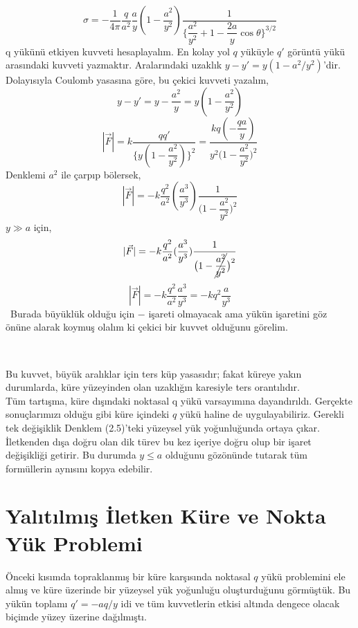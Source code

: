 \begin{theorem}
\[ \sigma = - \dfrac{1}{4 \pi}  \dfrac{q}{a^{2}}  \dfrac{a}{y}  ( 1 - \dfrac{a^{2}}{y^{2}}) \dfrac{1}{\Big\{ \dfrac{a^{2}}{y^{2}} + 1 - \dfrac{2a}{y} \cos \theta \Big\}^{3/2}} \tag{2.5} \]
q yükünü etkiyen kuvveti hesaplayalım. En kolay yol $q$ yüküyle $q'$ görüntü yükü arasındaki kuvveti yazmaktır. Aralarındaki uzaklık $y-y' = y (1- a^{2}/y^{2})$'dir. Dolayısıyla Coulomb yasasına göre, bu çekici kuvveti yazalım,
\[y-y' = y - \dfrac{a^{2}}{y} = y (1-\dfrac{a^{2}}{y^{2}}) \]
\[ |\Vec{F}| = k \dfrac{qq'}{\big\{ y (1- \dfrac{a^{2}}{y^{2}})  \big\}^{2}}  = \dfrac{kq (- \dfrac{qa}{y})}{y^{2} \big(1 - \dfrac{a^{2}}{y^{2}} \big)^{2}} \]
Denklemi $a^{2}$ ile çarpıp bölersek,
\[ |\Vec{F}| = - k \dfrac{q^{2}}{a^{2}} (\dfrac{a^{3}}{y^{3}}) \dfrac{1}{ \big(1 - \dfrac{a^{2}}{y^{2}}\big)^{2}} \tag{2.6}\]
$y \gg a$ için,
\[ |\Vec{F}| = - k \dfrac{q^{2}}{a^{2}} (\dfrac{a^{3}}{y^{3}}) \dfrac{1}{\big(1 - \cancel{\dfrac{a^{2}}{y^{2}}} \big)^{2}} \]
\[ |\Vec{F}| = -k \dfrac{q^{2}}{a^{2}} \dfrac{a^{3}}{y^{3}} = -k q^{2} \dfrac{a}{y^{3}} \]
\dangersign \ Burada büyüklük olduğu için $-$ işareti olmayacak ama yükün işaretini göz önüne alarak koymuş olalım ki çekici bir kuvvet olduğunu görelim.
\end{theorem}

\ 

Bu kuvvet, büyük aralıklar için ters küp yasasıdır; fakat küreye yakın durumlarda, küre yüzeyinden olan uzaklığın karesiyle ters orantılıdır.\\
Tüm tartışma, küre dışındaki noktasal q yükü varsayımına dayandırıldı. Gerçekte sonuçlarımızı olduğu gibi küre içindeki $q$ yükü haline de uygulayabiliriz. Gerekli tek değişiklik Denklem (2.5)'teki yüzeysel yük yoğunluğunda ortaya çıkar. İletkenden dışa doğru olan dik türev bu kez içeriye doğru olup bir işaret değişikliği getirir. Bu durumda $y \leq a $ olduğunu gözönünde tutarak tüm formüllerin aynısını kopya edebilir.

 
\section{Yalıtılmış İletken Küre ve Nokta Yük Problemi}

Önceki kısımda topraklanmış bir küre karşısında noktasal $q$ yükü problemini ele almış ve küre üzerinde bir yüzeysel yük yoğunluğu oluşturduğunu görmüştük. Bu yükün toplamı $q' = -aq/y$ idi ve tüm kuvvetlerin etkisi altında dengece olacak biçimde yüzey üzerine dağılmıştı.

\ 

